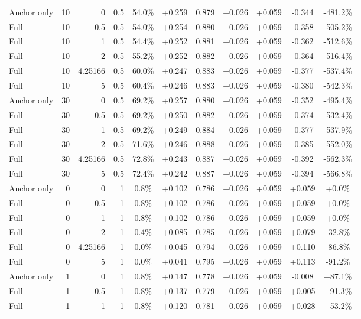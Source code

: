 \begin{table}[htbp]
\begin{tabular}{lrrrccccccc}
Anchor only & 10 & 0 & 0.5 & 54.0\% & +0.259 & 0.879 & +0.026 & +0.059 & -0.344 & -481.2\% \\
Full & 10 & 0.5 & 0.5 & 54.0\% & +0.254 & 0.880 & +0.026 & +0.059 & -0.358 & -505.2\% \\
Full & 10 & 1 & 0.5 & 54.4\% & +0.252 & 0.881 & +0.026 & +0.059 & -0.362 & -512.6\% \\
Full & 10 & 2 & 0.5 & 55.2\% & +0.252 & 0.882 & +0.026 & +0.059 & -0.364 & -516.4\% \\
Full & 10 & 4.25166 & 0.5 & 60.0\% & +0.247 & 0.883 & +0.026 & +0.059 & -0.377 & -537.4\% \\
Full & 10 & 5 & 0.5 & 60.4\% & +0.246 & 0.883 & +0.026 & +0.059 & -0.380 & -542.3\% \\
Anchor only & 30 & 0 & 0.5 & 69.2\% & +0.257 & 0.880 & +0.026 & +0.059 & -0.352 & -495.4\% \\
Full & 30 & 0.5 & 0.5 & 69.2\% & +0.250 & 0.882 & +0.026 & +0.059 & -0.374 & -532.4\% \\
Full & 30 & 1 & 0.5 & 69.2\% & +0.249 & 0.884 & +0.026 & +0.059 & -0.377 & -537.9\% \\
Full & 30 & 2 & 0.5 & 71.6\% & +0.246 & 0.888 & +0.026 & +0.059 & -0.385 & -552.0\% \\
Full & 30 & 4.25166 & 0.5 & 72.8\% & +0.243 & 0.887 & +0.026 & +0.059 & -0.392 & -562.3\% \\
Full & 30 & 5 & 0.5 & 72.4\% & +0.242 & 0.887 & +0.026 & +0.059 & -0.394 & -566.8\% \\
Anchor only & 0 & 0 & 1 & 0.8\% & +0.102 & 0.786 & +0.026 & +0.059 & +0.059 & +0.0\% \\
Full & 0 & 0.5 & 1 & 0.8\% & +0.102 & 0.786 & +0.026 & +0.059 & +0.059 & +0.0\% \\
Full & 0 & 1 & 1 & 0.8\% & +0.102 & 0.786 & +0.026 & +0.059 & +0.059 & +0.0\% \\
Full & 0 & 2 & 1 & 0.4\% & +0.085 & 0.785 & +0.026 & +0.059 & +0.079 & -32.8\% \\
Full & 0 & 4.25166 & 1 & 0.0\% & +0.045 & 0.794 & +0.026 & +0.059 & +0.110 & -86.8\% \\
Full & 0 & 5 & 1 & 0.0\% & +0.041 & 0.795 & +0.026 & +0.059 & +0.113 & -91.2\% \\
Anchor only & 1 & 0 & 1 & 0.8\% & +0.147 & 0.778 & +0.026 & +0.059 & -0.008 & +87.1\% \\
Full & 1 & 0.5 & 1 & 0.8\% & +0.137 & 0.779 & +0.026 & +0.059 & +0.005 & +91.3\% \\
Full & 1 & 1 & 1 & 0.8\% & +0.120 & 0.781 & +0.026 & +0.059 & +0.028 & +53.2\% \\

\end{tabular}
\end{table}
